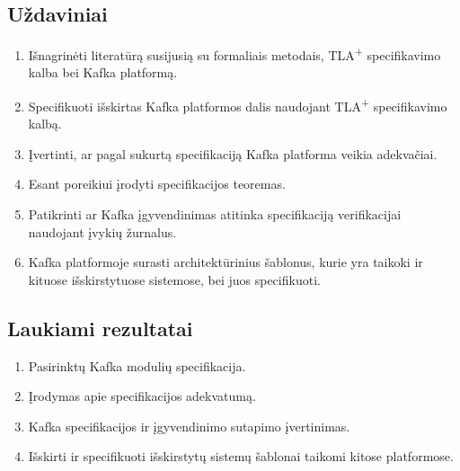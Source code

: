 \documentclass{VUMIFPSmagistrinis}
\begin{document}
	\subsection{Uždaviniai}
		\begin{enumerate}
			\item{Išnagrinėti literatūrą susijusią su formaliais metodais, TLA\textsuperscript{+} specifikavimo kalba bei Kafka platformą.}
			\item{Specifikuoti išskirtas Kafka platformos dalis naudojant TLA\textsuperscript{+} specifikavimo kalbą.}
			\item{Įvertinti, ar pagal sukurtą specifikaciją Kafka platforma veikia adekvačiai.}
			\item{Esant poreikiui įrodyti specifikacijos teoremas.}
			\item{Patikrinti ar Kafka įgyvendinimas atitinka specifikaciją verifikacijai naudojant įvykių žurnalus.}
			\item{Kafka platformoje surasti architektūrinius šablonus, kurie yra taikoki ir kituose išskirstytuose sistemose, bei juos specifikuoti.}
		\end{enumerate}
	
	\subsection{Laukiami rezultatai}
		\begin{enumerate}
			\item{Pasirinktų Kafka modulių specifikacija.}
			\item{Įrodymas apie specifikacijos adekvatumą.}
			\item{Kafka
 specifikacijos ir įgyvendinimo sutapimo įvertinimas.}
			\item{Išskirti ir specifikuoti išskirstytų sistemų šablonai taikomi kitose platformose.}
		\end{enumerate}
	
	\printbibliography[heading=bibintoc] 
\end{document}
